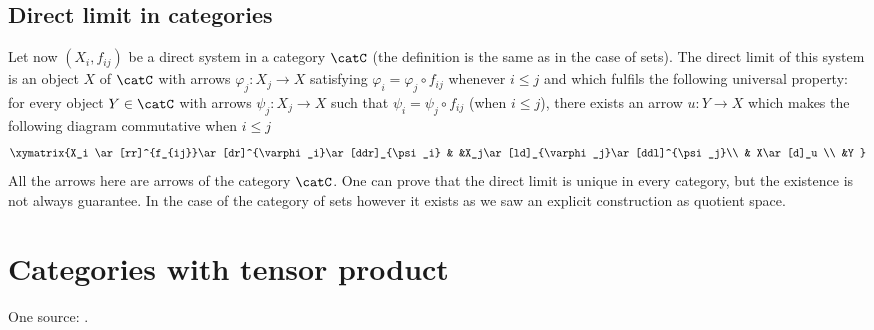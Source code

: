 \subsection{Direct limit in categories}

Let now $(X_i,f_{ij})$ be a direct system in a category $\catC$ (the definition is the same as in the case of sets). The direct limit of this system is an object $X$ of $\catC$ with arrows $\varphi_j\colon X_j\to X$ satisfying $\varphi_i=\varphi_j\circ f_{ij}$ whenever $i\leq j$ and which fulfils the following universal property: for every object $Y\in\catC$ with arrows $\psi_j\colon X_j\to X$ such that $\psi_i=\psi_j\circ f_{ij}$ (when $i\leq j$), there exists an arrow $u\colon Y\to X$ which makes the following diagram commutative when $i\leq j$
\begin{equation}
\xymatrix{%
   X_i \ar[rr]^{f_{ij}}\ar[dr]^{\varphi_i}\ar[ddr]_{\psi_i}		&		&X_j\ar[ld]_{\varphi_j}\ar[ddl]^{\psi_j}\\
									& X\ar[d]_u	\\
   									&Y
}
\end{equation}
All the arrows here are arrows of the category $\catC$. One can prove that the direct limit is unique in every category, but the existence is not always guarantee. In the case of the category of sets however it exists as we saw an explicit construction as quotient space.

\section{Categories with tensor product}
One source: \cite{Reshetikhin}.

